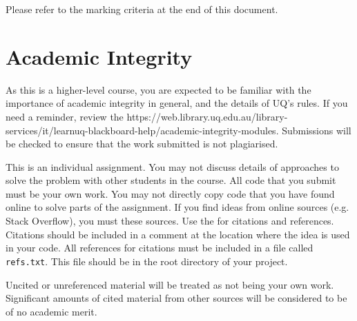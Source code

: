 \documentclass{csse4400}
\begin{document}
Please refer to the marking criteria at the end of this document.

\section{Academic Integrity}
As this is a higher-level course, you are expected to be familiar with the importance of academic integrity in general, and the details of UQ's rules. If you need a reminder, review the  {https://web.library.uq.edu.au/library-services/it/learnuq-blackboard-help/academic-integrity-modules}. Submissions will be checked to ensure that the work submitted is not plagiarised.

This is an individual assignment. You may not discuss details of approaches to solve the problem with other students in the course. All code that you submit must be your own work. You may not directly copy code that you have found online to solve parts of the assignment. If you find ideas from online sources (e.g. Stack Overflow), you must  these sources. Use the  for citations and references. Citations should be included in a comment at the location where the idea is used in your code. All references for citations must be included in a file called \texttt{refs.txt}. This file should be in the root directory of your project.

Uncited or unreferenced material will be treated as not being your own work. Significant amounts of cited material from other sources will be considered to be of no academic merit.






\end{document}
